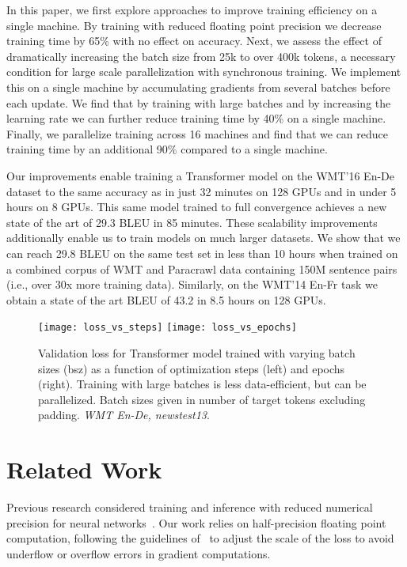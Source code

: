 \documentclass[11pt,a4paper]{article}
\begin{document}
In this paper, we first explore approaches to improve training efficiency on a single machine.
By training with reduced floating point precision we decrease training time by 65\% with no effect on accuracy.
Next, we assess the effect of dramatically increasing the batch size from 25k to over 400k tokens, a necessary condition for large scale parallelization with synchronous training.
We implement this on a single machine by accumulating gradients from several batches before each update.
We find that by training with large batches and by increasing the learning rate we can further reduce training time by 40\% on a single machine.
Finally, we parallelize training across 16 machines and find that we can reduce training time by an additional 90\% compared to a single machine.


Our improvements enable training a Transformer model on the WMT'16 En-De dataset to the same accuracy as \citet{vaswani2017transformer} in just 32 minutes on 128 GPUs and in under 5 hours on 8 GPUs.
This same model trained to full convergence achieves a new state of the art of 29.3 BLEU in 85 minutes.
These scalability improvements additionally enable us to train models on much larger datasets.
We show that we can reach 29.8 BLEU on the same test set in less than 10 hours when trained on a combined corpus of WMT and Paracrawl data containing 150M sentence pairs (i.e., over 30x more training data).
Similarly, on the WMT'14 En-Fr task we obtain a state of the art BLEU of 43.2 in 8.5 hours on 128 GPUs.

\begin{figure*}
\centering
\texttt{[image: loss\_vs\_steps]}
\quad
\texttt{[image: loss\_vs\_epochs]}
\quad
\caption{Validation loss for Transformer model trained with varying batch sizes (bsz) as a function of optimization steps (left) and epochs (right). Training with large batches is less data-efficient, but can be parallelized. Batch sizes given in number of target tokens excluding padding. \emph{WMT En-De, newstest13}.}
\label{fig:loss_vs_steps_epochs}
\end{figure*}

\section{Related Work}

Previous research considered training and inference with reduced
numerical precision for neural networks~\cite{simard1993nips,courbariaux2015iclr,sa2018lowprec}.
Our work relies on half-precision floating point computation, following the guidelines of~\citet{narang2018iclr} to adjust the scale of the loss to avoid underflow or overflow errors in gradient computations.
\end{document}
